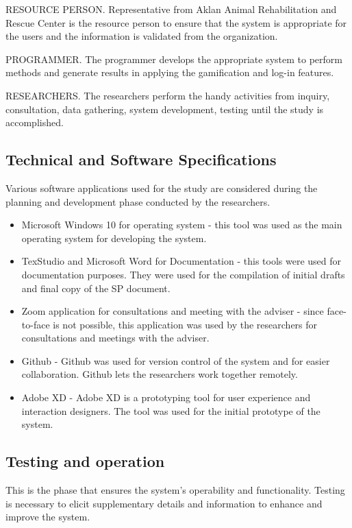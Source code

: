 RESOURCE PERSON. Representative from Aklan Animal Rehabilitation and
Rescue Center is the resource person to ensure that the system is appropriate for
the users and the information is validated from the organization.

PROGRAMMER. The programmer develops the appropriate system to perform
methods and generate results in applying the gamification and log-in features.

RESEARCHERS. The researchers perform the handy activities from inquiry,
consultation, data gathering, system development, testing until the study is accomplished.

\subsection{Technical and Software Specifications}

Various software applications used for the study are considered during
the planning and development phase conducted by the researchers.

\begin{itemize}
	\item Microsoft Windows 10 for operating system - this tool was used as the main
	operating system for developing the system.
	\item TexStudio and Microsoft Word for Documentation - this tools were used for
	documentation purposes. They were used for the compilation of initial drafts and final copy of
	the SP document.
	\item Zoom application for consultations and meeting with the adviser - since
	face-to-face is not possible, this application was used by the researchers for
	consultations and meetings with the adviser.
	\item Github - Github was used for version control of the system and for easier
	collaboration. Github lets the researchers work together remotely.
	\item Adobe XD - Adobe XD is a prototyping tool for user experience and
	interaction designers. The tool was used for the initial prototype of the
	system.
\end{itemize}

\subsection{Testing and operation}

This is the phase that ensures the system’s operability and functionality.
Testing is necessary to elicit supplementary details and information to enhance
and improve the system.

